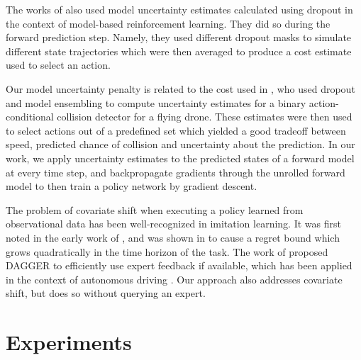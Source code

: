 \documentclass{article} %
\begin{document}

The works of \citep{DeepPilco, Chua2018} also used model uncertainty estimates calculated using dropout in the context of model-based reinforcement learning. They did so during the forward prediction step. Namely, they used different dropout masks to simulate different state trajectories which were then averaged to produce a cost estimate used to select an action.

Our model uncertainty penalty is related to the cost used in \citep{Kahn2017}, who used dropout and model ensembling to compute uncertainty estimates for a binary action-conditional collision detector for a flying drone. These estimates were then used to select actions out of a predefined set which yielded a good tradeoff between speed, predicted chance of collision and uncertainty about the prediction. In our work, we apply uncertainty estimates to the predicted states of a forward model at every time step, and backpropagate gradients through the unrolled forward model to then train a policy network by gradient descent.


The problem of covariate shift when executing a policy learned from observational data has been well-recognized in imitation learning.
It was first noted in the early work of \citep{Pomerleau91}, and was shown in \citep{Ross2010EfficientRF} to cause a regret bound which grows quadratically in the time horizon of the task.
The work of \citep{Dagger} proposed DAGGER to efficiently use expert feedback if available, which has been applied in the context of autonomous driving \citep{Zhang16}.
Our approach also addresses covariate shift, but does so without querying an expert.




\section{Experiments}
\label{experiments}
\end{document}
